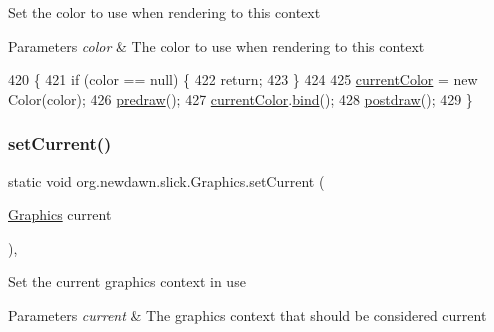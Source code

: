 Set the color to use when rendering to this context


\begin{DoxyParams}{Parameters}
{\em color} & The color to use when rendering to this context \\
\hline
\end{DoxyParams}

\begin{DoxyCode}
420                                       \{
421         \textcolor{keywordflow}{if} (color == null) \{
422             \textcolor{keywordflow}{return};
423         \}
424         
425         \mbox{\hyperlink{classorg_1_1newdawn_1_1slick_1_1_graphics_add4b542e574390a735aad66468135d5a}{currentColor}} = \textcolor{keyword}{new} Color(color);
426         \mbox{\hyperlink{classorg_1_1newdawn_1_1slick_1_1_graphics_a7b4c203181e3b6302d51ed9b24596b8d}{predraw}}();
427         \mbox{\hyperlink{classorg_1_1newdawn_1_1slick_1_1_graphics_add4b542e574390a735aad66468135d5a}{currentColor}}.\mbox{\hyperlink{classorg_1_1newdawn_1_1slick_1_1_color_ae4b71c94854f7983f2ccdb7340438e23}{bind}}();
428         \mbox{\hyperlink{classorg_1_1newdawn_1_1slick_1_1_graphics_abe054371d1486618ff327bbbcf02ff97}{postdraw}}();
429     \}
\end{DoxyCode}
\mbox{\label{classorg_1_1newdawn_1_1slick_1_1_graphics_ae48fbeb2d9125d9de9ec19c8d71c5df5}} 
\subsubsection{\texorpdfstring{set\+Current()}{setCurrent()}}
{\footnotesize\ttfamily static void org.\+newdawn.\+slick.\+Graphics.\+set\+Current (\begin{DoxyParamCaption}\item[{\mbox{\hyperlink{classorg_1_1newdawn_1_1slick_1_1_graphics}{Graphics}}}]{current }\end{DoxyParamCaption})\hspace{0.3cm}{\ttfamily [inline]}, {\ttfamily [static]}}

Set the current graphics context in use


\begin{DoxyParams}{Parameters}
{\em current} & The graphics context that should be considered current \\
\hline
\end{DoxyParams}

